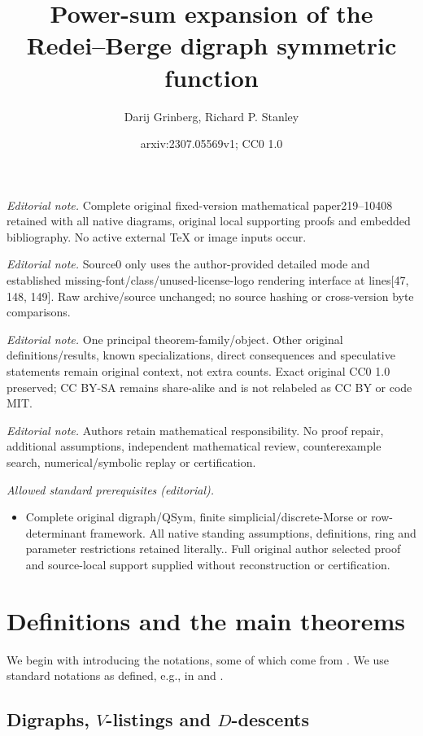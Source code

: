 \documentclass[numbers=enddot,12pt,final,onecolumn,notitlepage]{scrartcl}%
\title{Power-sum expansion of the Redei--Berge digraph symmetric function}
\author{Darij Grinberg, Richard P. Stanley}
\date{arxiv:2307.05569v1; CC0 1.0}
\numberwithin{exer}{section}
\theoremstyle{definition}
\begin{document}
\maketitle
\noindent\textit{Editorial note.} Complete original fixed-version mathematical paper219--10408 retained with all native diagrams, original local supporting proofs and embedded bibliography. No active external TeX or image inputs occur.\par\medskip
\noindent\textit{Editorial note.} Source0 only uses the author-provided detailed mode and established missing-font/class/unused-license-logo rendering interface at lines[47, 148, 149]. Raw archive/source unchanged; no source hashing or cross-version byte comparisons.\par\medskip
\noindent\textit{Editorial note.} One principal theorem-family/object. Other original definitions/results, known specializations, direct consequences and speculative statements remain original context, not extra counts. Exact original CC0 1.0 preserved; CC BY-SA remains share-alike and is not relabeled as CC BY or code MIT.\par\medskip
\noindent\textit{Editorial note.} Authors retain mathematical responsibility. No proof repair, additional assumptions, independent mathematical review, counterexample search, numerical/symbolic replay or certification.\par\medskip
\noindent\textit{Allowed standard prerequisites (editorial).}\begin{itemize}
\item Complete original digraph/QSym, finite simplicial/discrete-Morse or row-determinant framework. All native standing assumptions, definitions, ring and parameter restrictions retained literally.. Full original author selected proof and source-local support supplied without reconstruction or certification.
\end{itemize}\medskip
\section{Definitions and the main theorems}

We begin with introducing the notations, some of which come from \cite[Problem
120]{EC2supp}. We use standard notations as defined, e.g., in \cite[Chapter
7]{EC2} and \cite[Chapters 2 and 5]{GriRei}.

\subsection{Digraphs, $V$-listings and $D$-descents}
\end{document}
